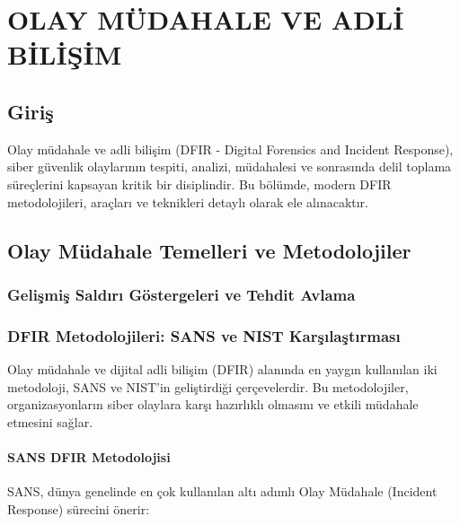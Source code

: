 \chapter{OLAY MÜDAHALE VE ADLİ BİLİŞİM}

\section*{Giriş}
Olay müdahale ve adli bilişim (DFIR - Digital Forensics and Incident Response), siber güvenlik olaylarının tespiti, analizi, müdahalesi ve sonrasında delil toplama süreçlerini kapsayan kritik bir disiplindir. Bu bölümde, modern DFIR metodolojileri, araçları ve teknikleri detaylı olarak ele alınacaktır.



\section{Olay Müdahale Temelleri ve Metodolojiler}



\subsection{Gelişmiş Saldırı Göstergeleri ve Tehdit Avlama}

\subsection{DFIR Metodolojileri: SANS ve NIST Karşılaştırması}

Olay müdahale ve dijital adli bilişim (DFIR) alanında en yaygın kullanılan iki metodoloji, SANS ve NIST'in geliştirdiği çerçevelerdir. Bu metodolojiler, organizasyonların siber olaylara karşı hazırlıklı olmasını ve etkili müdahale etmesini sağlar.

\subsubsection{SANS DFIR Metodolojisi}

SANS, dünya genelinde en çok kullanılan altı adımlı Olay Müdahale (Incident Response) sürecini önerir:

